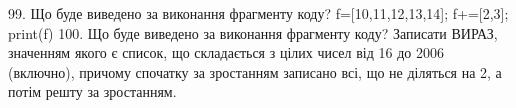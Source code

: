 \documentclass[11pt]{article}
\begin{document}
99. Що буде виведено за виконання фрагменту коду?
f=[10,11,12,13,14]; f+=[2,3]; print(f)
100. Що буде виведено за виконання фрагменту коду?
Записати ВИРАЗ, значенням якого є список, що складається з цілих чисел від 16 до 2006 (включно), причому спочатку за зростанням записано всі, що не діляться на 2, а потім решту за зростанням.




































































































\newpage
\end{document}
